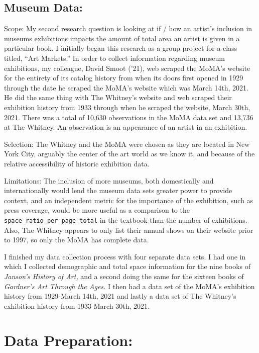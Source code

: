 \documentclass[
  letterpaper,
  DIV=11,
  numbers=noendperiod]{scrreprt}
\begin{document}
\hypertarget{museum-data}{%
\subsection{Museum Data:}\label{museum-data}}

Scope: My second research question is looking at if / how an artist's
inclusion in museums exhibitions impacts the amount of total area an
artist is given in a particular book. I initially began this research as
a group project for a class titled, ``Art Markets.'' In order to collect
information regarding museum exhibitions, my colleague, David Smoot
('21), web scraped the MoMA's website for the entirety of its catalog
history from when its doors first opened in 1929 through the date he
scraped the MoMA's website which was March 14th, 2021. He did the same
thing with The Whitney's website and web scraped their exhibition
history from 1933 through when he scraped the website, March 30th, 2021.
There was a total of 10,630 observations in the MoMA data set and 13,736
at The Whitney. An observation is an appearance of an artist in an
exhibition.

Selection: The Whitney and the MoMA were chosen as they are located in
New York City, arguably the center of the art world as we know it, and
because of the relative accessibility of historic exhibition data.~

Limitations: The inclusion of more museums, both domestically and
internationally would lend the museum data sets greater power to provide
context, and an independent metric for the importance of the exhibition,
such as press coverage, would be more useful as a comparison to the
\texttt{space\_ratio\_per\_page\_total} in the textbook than the number
of exhibitions. Also, The Whitney appears to only list their annual
shows on their website prior to 1997, so only the MoMA has complete
data.

I finished my data collection process with four separate data sets. I
had one in which I collected demographic and total space information for
the nine books of \emph{Janson's History of Art,} and a second doing the
same for the sixteen books of \emph{Gardner's Art Through the Ages.} I
then had a data set of the MoMA's exhibition history from 1929-March
14th, 2021 and lastly a data set of The Whitney's exhibition history
from 1933-March 30th, 2021.

\hypertarget{data-preparation}{%
\section{Data Preparation:}\label{data-preparation}}
\end{document}
